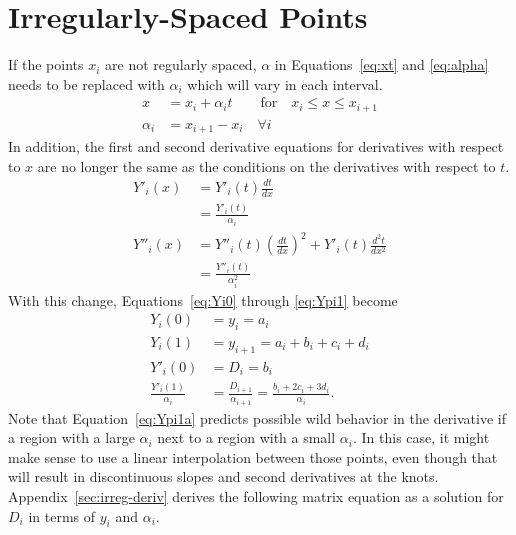 \documentclass{scrartcl}
\begin{document}
\section{Irregularly-Spaced Points}
If the points $x_i$ are not regularly spaced, $\alpha$ in
Equations~\ref{eq:xt} and \ref{eq:alpha} needs to be replaced
with $\alpha_i$ which will vary in each interval.
\begin{align}
x &= x_i + \alpha_i t \qquad\mbox{for}\quad x_i\leq x\leq x_{i+1}\\
\alpha_i &= x_{i+1}-x_i \quad\forall i
\end{align}
In addition,
the first and second derivative equations for derivatives with
respect to $x$ are no longer the same as the conditions on the
derivatives with respect to $t$.
\begin{align}
Y'_i(x) &= Y'_i(t)\frac{dt}{dx}\\
&= \frac{Y'_i(t)}{\alpha_i}\\
Y''_i(x) &= Y''_i(t)\left(\frac{dt}{dx}\right)^2 +
	Y'_i(t)\frac{d^2t}{dx^2}\\
	&= \frac{Y''_i(t)}{\alpha_i^2}
\end{align}
With this change, Equations~\ref{eq:Yi0} through \ref{eq:Ypi1}
become
\begin{align}
Y_i(0)&=y_i = a_i \label{eq:Yi0a}\\
Y_i(1)&=y_{i+1} = a_i + b_i + c_i + d_i\\
Y'_i(0) &= D_i = b_i\\
\frac{Y'_i(1)}{\alpha_i} &= \frac{D_{i+1}}{\alpha_{i+1}}
 = \frac{b_i + 2 c_i + 3 d_i}{\alpha_i}. \label{eq:Ypi1a}
\end{align}
Note that Equation~\ref{eq:Ypi1a} predicts possible
wild behavior in the derivative if
a region with a large $\alpha_i$ next to a region
with a small $\alpha_i$. In this case, it might make sense to
use a linear interpolation between those points, even though
that will result in discontinuous slopes and second derivatives
at the knots. Appendix~\ref{sec:irreg-deriv} derives the following
matrix equation as a solution for $D_i$ in terms of
$y_i$ and $\alpha_i$.
\end{document}
